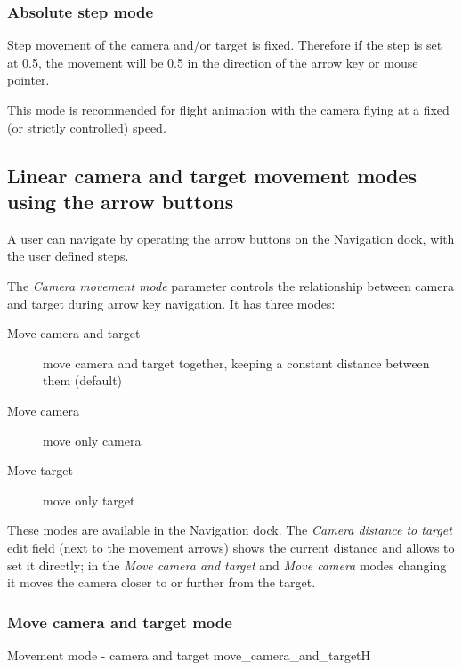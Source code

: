 \subsubsection{Absolute step mode}\label{absolute-step-mode}

Step movement of the camera and/or target is fixed. Therefore if the step is set
at 0.5, the movement will be 0.5 in the direction of the arrow key or mouse
pointer.

This mode is recommended for flight animation with the camera flying at a fixed (or strictly
controlled) speed.

\subsection{Linear camera and target movement modes using the arrow buttons}\label{linear-camera-and-target-movement-modes-using-the-arrow-buttons}

A user can navigate by operating the arrow buttons on the Navigation dock, with the
user defined steps.

The \emph{Camera movement mode} parameter controls the relationship between camera and target during arrow key navigation. It has three modes:

\begin{description}
	\item[Move camera and target] move camera and target together, keeping a constant distance between them (default)
	\item[Move camera] move only camera
	\item[Move target] move only target
\end{description}

These modes are available in the Navigation dock. The \emph{Camera distance to target} edit field (next to the movement arrows) shows the current distance and allows to set it directly; in the \emph{Move camera and target} and \emph{Move camera} modes changing it moves the camera closer to or further from the target.

\subsubsection{Move camera and target mode}\label{move-camera-and-target-mode}

{Movement mode - camera and target}
{move_camera_and_target}{H}

